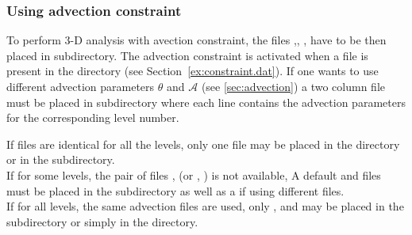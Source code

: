 \begin{center}
\end{center}


\subsubsection{Using advection constraint}


To perform 3-D analysis with avection constraint, the files ,\linebreak {}, ,  have to be then placed in  subdirectory. The advection constraint is activated when a  file is present in the  directory (see Section~\ref{ex:constraint.dat}). If one wants to use different advection parameters $\theta$ and $\mathcal{A}$ (see \ref{sec:advection}) a two column  file must be placed in  subdirectory where each line contains the advection parameters for the corresponding level number.

If  files are identical for all the levels, only one file  may be placed in the  directory or in the  subdirectory.\\
 If for some levels, the pair of files ,  (or , ) is not available, A default  and  files must be placed in the  subdirectory as well as a  if using different  files.\\
 If for all levels, the same advection files are used, only  ,  and  may be placed in the  subdirectory or simply in the  directory.


\begin{center}
\end{center}


